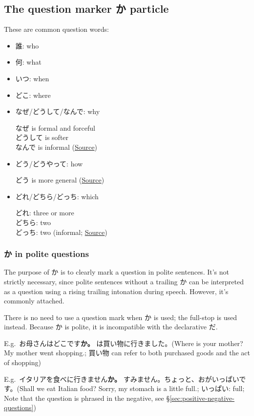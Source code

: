 \documentclass[../nihongo-gakushuu-kyouzai.tex]{subfiles}
\begin{document}
\subsection{The question marker か particle}
These are common question words:
\begin{itemize}
    \item 誰: who
    \item 何: what
    \item いつ: when
    \item どこ: where
    \item なぜ/どうして/なんで: why

    なぜ is formal and forceful\\
    どうして is softer\\
    なんで is informal (\href{https://www.reddit.com/r/LearnJapanese/comments/nxxep9/difference_between_%E3%81%A9%E3%81%86%E3%81%97%E3%81%A6_%E3%81%AA%E3%82%93%E3%81%A7_and_%E3%81%AA%E3%81%9C/}{Source})
    \item どう/どうやって: how

    どう is more general (\href{https://ja.hinative.com/questions/161399}{Source})
    \item どれ/どちら/どっち: which

    どれ: three or more\\
    どちら: two\\
    どっち: two (informal; \href{https://www.tofugu.com/japanese-grammar/kore-sore-are-dore/}{Source})
\end{itemize}

\subsubsection{か in polite questions}
The purpose of か is to clearly mark a question in polite sentences. It's not strictly necessary, since polite sentences without a trailing か can be interpreted as a question using a rising trailing intonation during speech. However, it's commonly attached.

There is no need to use a question mark when か is used; the full-stop is used instead. Because か is polite, it is incompatible with the declarative だ.

E.g.\ お母さんはどこです\textbf{か。} は買い物に行きました。(Where is your mother? My mother went shopping.; 買い物 can refer to both purchased goods and the act of shopping)

E.g.\ イタリアを食べに行きません\textbf{か。} すみません。ちょっと、おがいっぱいです。(Shall we eat Italian food? Sorry, my stomach is a little full.; いっぱい: full; Note that the question is phrased in the negative, see \S\ref{sec:positive-negative-questions})
\end{document}
